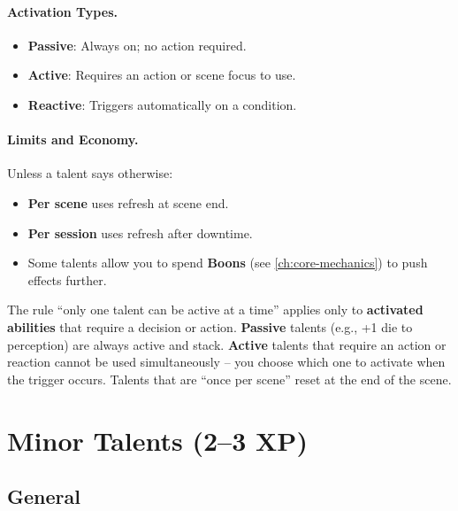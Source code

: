 \paragraph{Activation Types.}
\label{sec:talent-activation}
\begin{itemize}
\item \textbf{Passive}: Always on; no action required.
\item \textbf{Active}: Requires an action or scene focus to use.
\item \textbf{Reactive}: Triggers automatically on a condition.
\end{itemize}

\paragraph{Limits and Economy.}
\label{sec:talent-limits}
Unless a talent says otherwise:
\begin{itemize}
\item \textbf{Per scene} uses refresh at scene end.
\item \textbf{Per session} uses refresh after downtime.
\item Some talents allow you to spend \textbf{Boons} (see \ref{ch:core-mechanics}) to push effects further.
\end{itemize}

\begin{tcolorbox}[colback=yellow!5!white,colframe=yellow!75!black,title=\textbf{Only One Active Talent?}]
The rule “only one talent can be active at a time” applies only to \textbf{activated abilities} that require a decision or action.  
\textbf{Passive} talents (e.g., +1 die to perception) are always active and stack.  
\textbf{Active} talents that require an action or reaction cannot be used simultaneously – you choose which one to activate when the trigger occurs.  
Talents that are “once per scene” reset at the end of the scene.
\end{tcolorbox}

\section{Minor Talents (2–3 XP)}
\label{sec:minor-talents}

\subsection*{General}
\label{sec:minor-general}


